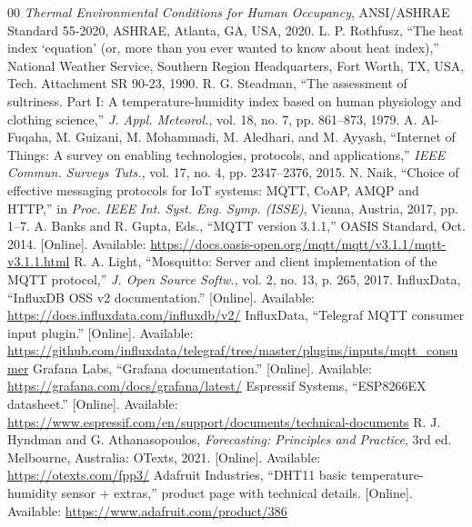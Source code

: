 \documentclass[conference]{IEEEtran}
\begin{document}
\begin{thebibliography}{00}
 \textit{Thermal Environmental Conditions for Human Occupancy},
  ANSI/ASHRAE Standard 55-2020, ASHRAE, Atlanta, GA, USA, 2020.
 L. P. Rothfusz, ``The heat index `equation' (or, more than you ever
  wanted to know about heat index),'' National Weather Service, Southern Region
  Headquarters, Fort Worth, TX, USA, Tech. Attachment SR 90-23, 1990.
 R. G. Steadman, ``The assessment of sultriness. Part I: A
  temperature-humidity index based on human physiology and clothing science,''
  \textit{J. Appl. Meteorol.}, vol. 18, no. 7, pp. 861--873, 1979.
 A. Al-Fuqaha, M. Guizani, M. Mohammadi, M. Aledhari, and M. Ayyash,
  ``Internet of Things: A survey on enabling technologies, protocols, and applications,''
  \textit{IEEE Commun. Surveys Tuts.}, vol. 17, no. 4, pp. 2347--2376, 2015.
 N. Naik, ``Choice of effective messaging protocols for IoT systems: MQTT,
  CoAP, AMQP and HTTP,'' in \textit{Proc. IEEE Int. Syst. Eng. Symp. (ISSE)}, Vienna,
  Austria, 2017, pp. 1--7.
 A. Banks and R. Gupta, Eds., ``MQTT version 3.1.1,'' OASIS Standard,
  Oct. 2014. [Online]. Available: \url{https://docs.oasis-open.org/mqtt/mqtt/v3.1.1/mqtt-v3.1.1.html}
 R. A. Light, ``Mosquitto: Server and client implementation of the
  MQTT protocol,'' \textit{J. Open Source Softw.}, vol. 2, no. 13, p. 265, 2017.
 InfluxData, ``InfluxDB OSS v2 documentation.'' [Online]. Available:
  \url{https://docs.influxdata.com/influxdb/v2/}
 InfluxData, ``Telegraf MQTT consumer input plugin.'' [Online].
  Available: \url{https://github.com/influxdata/telegraf/tree/master/plugins/inputs/mqtt_consumer}
 Grafana Labs, ``Grafana documentation.'' [Online]. Available:
  \url{https://grafana.com/docs/grafana/latest/}
 Espressif Systems, ``ESP8266EX datasheet.'' [Online]. Available:
  \url{https://www.espressif.com/en/support/documents/technical-documents}
 R. J. Hyndman and G. Athanasopoulos, \textit{Forecasting: Principles
  and Practice}, 3rd ed. Melbourne, Australia: OTexts, 2021. [Online]. Available:
  \url{https://otexts.com/fpp3/}
 Adafruit Industries, ``DHT11 basic temperature-humidity sensor + extras,''
  product page with technical details. [Online]. Available: \url{https://www.adafruit.com/product/386}
\end{thebibliography}
\end{document}
